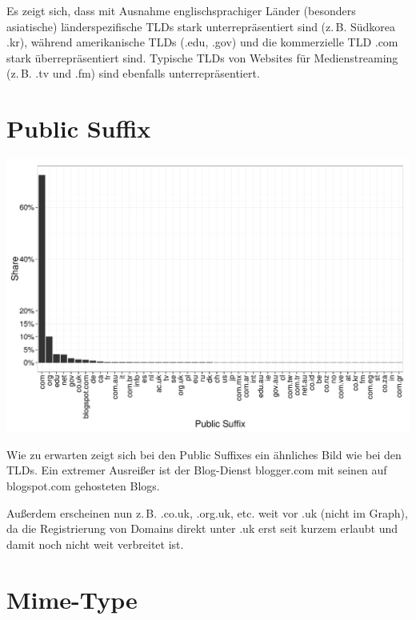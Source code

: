 \documentclass[a4paper,12pt,titlepage=false]{scrreprt}
\begin{document}
Es zeigt sich, dass mit Ausnahme englischsprachiger Länder (besonders asiatische) länderspezifische TLDs stark unterrepräsentiert sind (z.\,B. Südkorea .kr), während amerikanische TLDs (.edu, .gov) und die kommerzielle TLD .com stark überrepräsentiert sind. Typische TLDs von Websites für Medienstreaming (z.\,B. .tv und .fm) sind ebenfalls unterrepräsentiert.

\section{Public Suffix}

\begin{center}
    \includegraphics[width=.9\textwidth]{plots/plot_pub_suffixes_top50}
\end{center}

\noindent
Wie zu erwarten zeigt sich bei den Public Suffixes ein ähnliches Bild wie bei den TLDs. Ein extremer Ausreißer ist der Blog-Dienst blogger.com mit seinen auf blogspot.com gehosteten Blogs.

Außerdem erscheinen nun z.\,B. .co.uk, .org.uk, etc. weit vor .uk (nicht im Graph), da die Registrierung von Domains direkt unter .uk erst seit kurzem erlaubt und damit noch nicht weit verbreitet ist.

\section{Mime-Type}
\vspace{.1cm}
\end{document}
